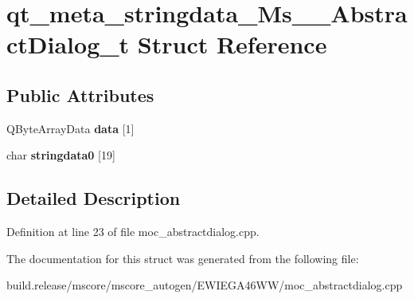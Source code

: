 \hypertarget{structqt__meta__stringdata___ms_____abstract_dialog__t}{}\section{qt\+\_\+meta\+\_\+stringdata\+\_\+\+Ms\+\_\+\+\_\+\+Abstract\+Dialog\+\_\+t Struct Reference}
\label{structqt__meta__stringdata___ms_____abstract_dialog__t}
\subsection*{Public Attributes}
\begin{DoxyCompactItemize}
\item 
\mbox{\label{structqt__meta__stringdata___ms_____abstract_dialog__t_aaa499ea15037584786ce23ff19a53287}} 
Q\+Byte\+Array\+Data {\bfseries data} \mbox{[}1\mbox{]}
\item 
\mbox{\label{structqt__meta__stringdata___ms_____abstract_dialog__t_a6a48a5ea1c5d56ee225c32da7850fa40}} 
char {\bfseries stringdata0} \mbox{[}19\mbox{]}
\end{DoxyCompactItemize}


\subsection{Detailed Description}


Definition at line 23 of file moc\+\_\+abstractdialog.\+cpp.



The documentation for this struct was generated from the following file\+:\begin{DoxyCompactItemize}
\item 
build.\+release/mscore/mscore\+\_\+autogen/\+E\+W\+I\+E\+G\+A46\+W\+W/moc\+\_\+abstractdialog.\+cpp\end{DoxyCompactItemize}
